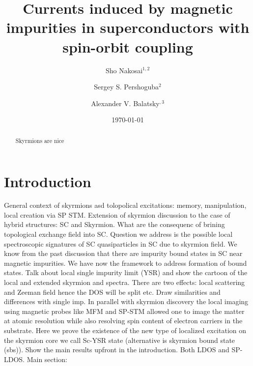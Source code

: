 \documentclass[twocolumn,showpacs,floatfix,nofootinbib,longbibliography]{revtex4-1}
\begin{document}
\title{Currents induced by magnetic impurities in superconductors with spin-orbit coupling}

\author{Sho Nakosai$^{1,2}$}
\author{Sergey S. Pershoguba$^{2}$}
\author{Alexander V. Balatsky$^{,3}$}

\date{\today}

\begin{abstract}
Skyrmions are nice
\end{abstract}

\pacs{ }   


\maketitle
\section{Introduction} \label{sec:intro}

General context of skyrmions asd tolopolical excitations: memory, manipulation, local creation via SP STM.
Extension of skyrmion discussion to the case of hybrid structures: SC and Skyrmion. What are the consequenc of brining topological exchange field into SC. Question we address is the possible local spectroscopic signatures of SC quasiparticles in SC due to skyrmion field. We know from the past discussion that there are impurity bound states in SC near magnetic impurities. We have now the framework to address formation of bound states. Talk about local single impurity limit (YSR) and show the cartoon of the local and extended skyrmion and spectra. There are two effects: local scattering and Zeeman field hence the DOS will be split etc.  Draw similarities and differences with single imp.
In parallel with skyrmion discovery the local imaging using magnetic probes like MFM and SP-STM allowed one to image the matter at atomic resolution while also resolving spin content of electron carriers in the substrate.  
Here we prove the existence of the new type of localized excitation on the skyrmion core we call  Sc-YSR state (alternative is skyrmion bound state (sbs)).  Show the main results upfront in the introduction. Both LDOS and SP-LDOS. 
Main section: 
\end{document}
